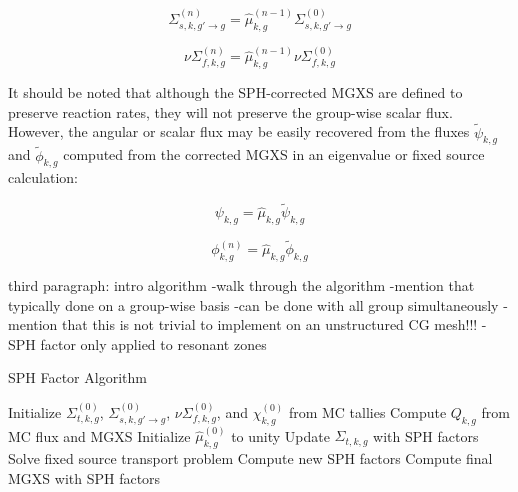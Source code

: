 \begin{dmath}
\label{eqn:chap6-sph-update-sigs}
\Sigma_{s,k,g'\rightarrow g}^{(n)} = \hat{\mu}_{k,g}^{(n-1)}\Sigma_{s,k,g'\rightarrow g}^{(0)}
\end{dmath}

\begin{dmath}
\label{eqn:chap6-sph-update-nusigf}
\nu\Sigma_{f,k,g}^{(n)} = \hat{\mu}_{k,g}^{(n-1)}\nu\Sigma_{f,k,g}^{(0)}
\end{dmath}

It should be noted that although the \ac{SPH}-corrected \ac{MGXS} are defined to preserve reaction rates, they will not preserve the group-wise scalar flux. However, the angular or scalar flux may be easily recovered from the fluxes $\tilde{\psi}_{k,g}$ and $\tilde{\phi}_{k,g}$ computed from the corrected \ac{MGXS} in an eigenvalue or fixed source calculation:

\begin{dmath}
\label{eqn:chap6-sph-update-angular-flux}
\psi_{k,g} = \hat{\mu}_{k,g}\tilde{\psi}_{k,g}
\end{dmath}

\begin{dmath}
\label{eqn:chap6-sph-update-scalar-flux}
\phi_{k,g}^{(n)} = \hat{\mu}_{k,g}\tilde{\phi}_{k,g}
\end{dmath}

third paragraph: intro algorithm
-walk through the algorithm
-mention that typically done on a group-wise basis
-can be done with all group simultaneously
-mention that this is not trivial to implement on an unstructured \ac{CG} mesh!!!
-SPH factor only applied to resonant zones

\begin{algorithm}[h]
\caption{SPH Factor Algorithm}
\label{alg:chap6-sph}
\begin{algorithmic}[1]
  \State Initialize $\Sigma_{t,k,g}^{(0)}$, $\Sigma_{s,k,g'\rightarrow g}^{(0)}$, $\nu\Sigma_{f,k,g}^{(0)}$, and $\chi_{k,g}^{(0)}$ from MC tallies 
  \State Compute $Q_{k,g}$ from MC flux and \ac{MGXS} 
  \State Initialize $\hat{\mu}_{k,g}^{(0)}$ to unity
    \State Update $\Sigma_{t,k,g}$ with \ac{SPH} factors 
    \State Solve fixed source transport problem\footnotemark {}
    \State Compute new \ac{SPH} factors 
  \EndWhile
  \State Compute final \ac{MGXS} with \ac{SPH} factors 
\end{algorithmic}
\end{algorithm}

